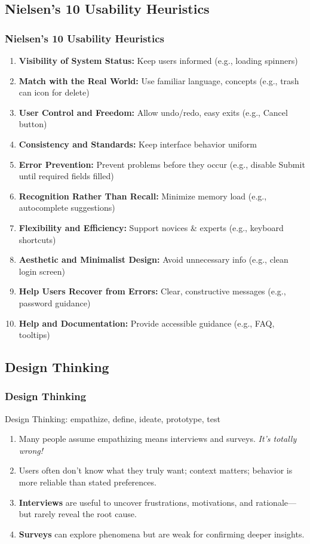 \documentclass{beamer}
\begin{document}
\subsection{Nielsen’s 10 Usability Heuristics}

\begin{frame}
\frametitle{Nielsen’s 10 Usability Heuristics}
\footnotesize
    \begin{enumerate}
        \item \textbf{Visibility of System Status:} Keep users informed (e.g., loading spinners)
        \item \textbf{Match with the Real World:} Use familiar language, concepts (e.g., trash can icon for delete)
        \item \textbf{User Control and Freedom:} Allow undo/redo, easy exits (e.g., Cancel button)
        \item \textbf{Consistency and Standards:} Keep interface behavior uniform
        \item \textbf{Error Prevention:} Prevent problems before they occur (e.g., disable Submit until required fields filled)
        \item \textbf{Recognition Rather Than Recall:} Minimize memory load (e.g., autocomplete suggestions)
        \item \textbf{Flexibility and Efficiency:} Support novices & experts (e.g., keyboard shortcuts)
        \item \textbf{Aesthetic and Minimalist Design:} Avoid unnecessary info (e.g., clean login screen)
        \item \textbf{Help Users Recover from Errors:} Clear, constructive messages (e.g., password guidance)
        \item \textbf{Help and Documentation:} Provide accessible guidance (e.g., FAQ, tooltips)
    \end{enumerate}
\end{frame}


\subsection{Design Thinking}

\begin{frame}
\frametitle{Design Thinking}
Design Thinking: empathize, define, ideate, prototype, test
\begin{enumerate}
    \item Many people assume empathizing means interviews and surveys. \textit{ It's totally wrong!}
    \item Users often don’t know what they truly want; context matters; behavior is more reliable than stated preferences.
    \item \textbf{Interviews} are useful to uncover frustrations, motivations, and rationale—but rarely reveal the root cause.
    \item \textbf{Surveys} can explore phenomena but are weak for confirming deeper insights.
\end{enumerate}
\end{frame}
\end{document}
